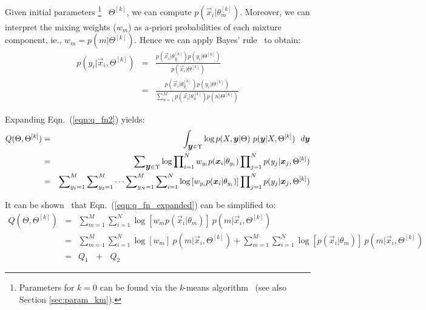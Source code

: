 \noindent
Given initial parameters%
%
\footnote{Parameters for $k=0$ can be found via the {\it k}-means algorithm~\cite{Bishop_2006,Duda01,Linde80} (see also Section \ref{sec:param_km}).}
%
~$\Theta^{[k]}$,
we can compute $p(\Vec{x}_i | \theta_m^{[k]})$.
Moreover, we can interpret the mixing weights ($w_m$) as {a-priori} probabilities of each mixture component, ie., $w_m = p(m | \Theta^{[k]})$.
Hence we can apply Bayes' rule~\cite{Duda01} to obtain:
%
\begin{eqnarray}
	p(y_i | \Vec{x}_i, \Theta^{[k]}) & = & \frac{ p(\Vec{x}_i | \theta_{y_i}^{[k]}) p(y_i | \Theta^{[k]}) }{ p(\Vec{x}_i | \Theta^{[k]}) } \\
	~ & = & \frac{ p(\Vec{x}_i | \theta_{y_i}^{[k]}) p(y_i | \Theta^{[k]}) }{ \sum\nolimits_{n=1}^{M} p(\Vec{x}_i | \theta_{n}^{[k]}) p(n | \Theta^{[k]})}
	\label{eqn:p_yi}
\end{eqnarray}

\noindent
Expanding Eqn.~(\ref{eqn:q_fn2}) yields:
%
\begin{eqnarray}
	Q(\Theta, \Theta^{[k]}) & = & \int_{\mbox{\boldmath $y$} \in \Upsilon}
									\log p(X,\mbox{\boldmath $y$} | \Theta) ~ p(\mbox{\boldmath $y$}|X,\Theta^{[k]}) ~~ d \mbox{\boldmath $y$} \\
							~ & = & \sum\nolimits_{\mbox{\boldmath $y$} \in \Upsilon}  \log \prod\nolimits_{i=1}^{N} w_{y_i} p(\Vec{x}_i | \theta_{y_i})  
																		\prod\nolimits_{j=1}^{N} p(y_j | \Vec{x}_j, \Theta^{[k]} ) \\
							~ & = & \sum\nolimits_{y_1=1}^{M} \sum\nolimits_{y_2=1}^{M} \cdots \sum\nolimits_{y_N=1}^{M} 
															\sum\nolimits_{i=1}^{N} \log \left[ w_{y_i} p(\Vec{x}_i | \theta_{y_i}) \right] 
															\prod\nolimits_{j=1}^{N} p(y_j | \Vec{x}_j, \Theta^{[k]} )  \label{eqn:q_fn_expanded}
\end{eqnarray}%

\noindent
It can be shown~\cite{Bilmes98} that Eqn.~(\ref{eqn:q_fn_expanded}) can be simplified to:
%
\begin{eqnarray}
	Q(\Theta, \Theta^{[k]}) & = & \sum\nolimits_{m=1}^{M}  \sum\nolimits_{i=1}^{N} \log[ w_m  p(\Vec{x}_i | \theta_m)] ~ p(m|\Vec{x}_i, \Theta^{[k]}) \\
							~ & = & \sum\nolimits_{m=1}^{M}  \sum\nolimits_{i=1}^{N} \log[ w_m ] ~  p(m|\Vec{x}_i, \Theta^{[k]}) +
									\sum\nolimits_{m=1}^{M}	\sum\nolimits_{i=1}^{N} \log[  p(\Vec{x}_i | \theta_m) ] ~ p(m|\Vec{x}_i, \Theta^{[k]}) ~~~ \\
							~ & = & Q_1 ~~~ + ~~~ Q_2 
\end{eqnarray}%

